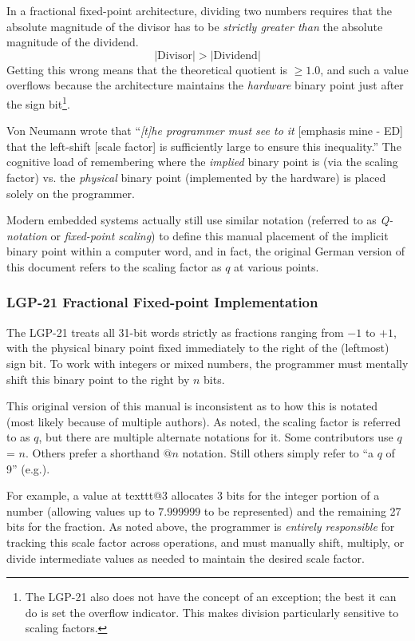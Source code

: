 In a fractional fixed-point architecture, dividing two numbers requires that the absolute magnitude of the divisor has to be \emph{strictly greater than} the absolute magnitude of the dividend.$$\left| \text{Divisor} \right| > \left| \text{Dividend} \right|$$Getting this wrong means that the theoretical quotient is $\ge 1.0$, and such a value overflows because the architecture maintains the \emph{hardware} binary point just after the sign bit\footnote{The LGP-21 also does not have the concept of an exception; the best it can do is set the overflow indicator. This makes division particularly sensitive to scaling factors.}.

Von Neumann wrote that ``\emph{[t]he programmer must see to it} [emphasis mine - ED] that the left-shift [scale factor] is sufficiently large to ensure this inequality.''\cite{burks1946preliminary} The cognitive load of remembering where the \emph{implied} binary point is (via the scaling factor) vs. the \emph{physical} binary point (implemented by the hardware) is placed solely on the programmer.

Modern embedded systems actually still use similar notation (referred to as \emph{Q-notation} or \emph{fixed-point scaling}) to define this manual placement of the implicit binary point within a computer word, and in fact, the original German version of this document refers to the scaling factor as $q$ at various points.

\subsubsection*{LGP-21 Fractional Fixed-point Implementation}
\label{sec:fractional-fixed-point}
The LGP-21 treats all 31-bit words strictly as fractions ranging from $-1$ to $+1$, with the physical binary point fixed immediately to the right of the (leftmost) sign bit. To work with integers or mixed numbers, the programmer must mentally shift this binary point to the right by $n$ bits.

This original version of this manual is inconsistent as to how this is notated (most likely because of multiple authors). As noted, the scaling factor is referred to as $q$, but there are multiple alternate notations for it. Some contributors use $q$ = $n$. Others prefer a shorthand $@n$ notation. Still others simply refer to ``a $q$ of 9'' (e.g.).

For example, a value at texttt{@3} allocates 3 bits for the integer portion of a number (allowing values up to $7.999999$ to be represented) and the remaining 27 bits for the fraction. As noted above, the programmer is \emph{entirely responsible} for tracking this scale factor across operations, and must manually shift, multiply, or divide intermediate values as needed to maintain the desired scale factor.

